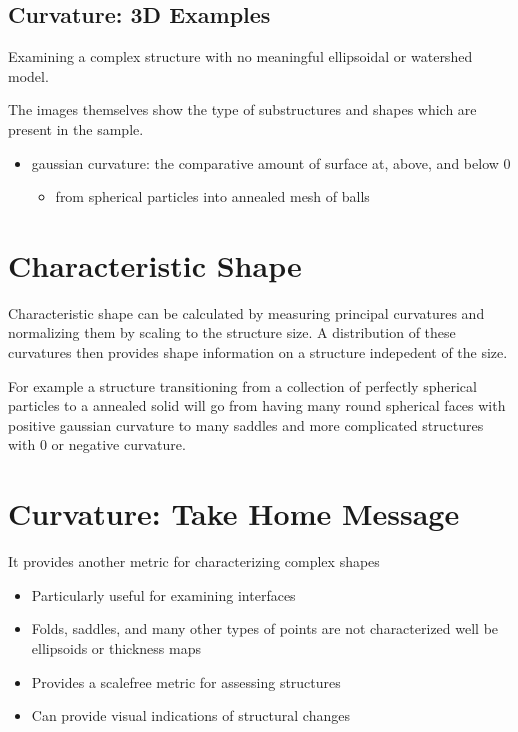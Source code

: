 \documentclass[letterpaper,10pt,english]{sphinxmanual}
\begin{document}
\section{Curvature: 3D Examples}
\label{\detokenize{06-AdvancedShapeAndTexture:curvature-3d-examples}}
\sphinxAtStartPar
Examining a complex structure with no meaningful ellipsoidal or watershed model.

\sphinxAtStartPar
The images themselves show the type of substructures and shapes which are present in the sample.


\begin{itemize}
\item {} 
\sphinxAtStartPar
gaussian curvature:  the comparative amount of surface at, above, and below 0
\begin{itemize}
\item {} 
\sphinxAtStartPar
from spherical particles into annealed mesh of balls

\end{itemize}

\end{itemize}




\chapter{Characteristic Shape}
\label{\detokenize{06-AdvancedShapeAndTexture:characteristic-shape}}
\sphinxAtStartPar
Characteristic shape can be calculated by measuring principal curvatures and normalizing them by scaling to the structure size. A distribution of these curvatures then provides shape information on a structure indepedent of the size.

\sphinxAtStartPar
For example a structure transitioning from a collection of perfectly spherical particles to a annealed solid will go from having many round spherical faces with positive gaussian curvature to many saddles and more complicated structures with 0 or negative curvature.


\chapter{Curvature: Take Home Message}
\label{\detokenize{06-AdvancedShapeAndTexture:curvature-take-home-message}}
\sphinxAtStartPar
It provides another metric for characterizing complex shapes
\begin{itemize}
\item {} 
\sphinxAtStartPar
Particularly useful for examining interfaces

\item {} 
\sphinxAtStartPar
Folds, saddles, and many other types of points are not characterized well be ellipsoids or thickness maps

\item {} 
\sphinxAtStartPar
Provides a scale\sphinxhyphen{}free metric for assessing structures

\item {} 
\sphinxAtStartPar
Can provide visual indications of structural changes

\end{itemize}
\end{document}

